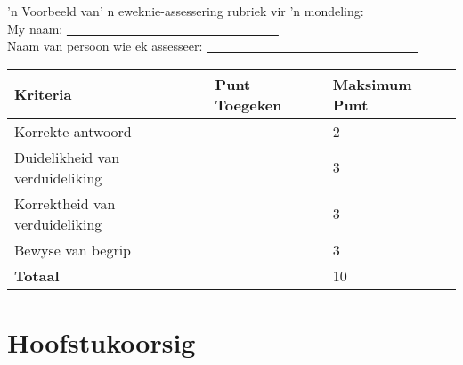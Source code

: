 'n Voorbeeld van' n eweknie-assessering rubriek vir 'n mondeling:\\
My naam: \underline{~~~~~~~~~~~~~~~~~~~~~~~~~~~~~~~~~~}\\
Naam van persoon wie ek assesseer: \underline{~~~~~~~~~~~~~~~~~~~~~~~~~~~~~~~~~~}\\

\begin{table}[H]
 \begin{center}
  \begin{tabular}{|p{5cm}|p{2.5cm}|p{2.5cm}|} \hline
  \textbf{Kriteria} & \textbf{Punt Toegeken} & \textbf{Maksimum Punt}\\ \hline
Korrekte antwoord &&2\\ \hline
Duidelikheid van verduideliking&&3\\ \hline
Korrektheid van verduideliking  &&3\\ \hline
Bewyse van begrip &&3\\ \hline
\textbf{Totaal} &&10\\ \hline

  \end{tabular}

 \end{center}

\end{table}

\section{Hoofstukoorsig}
